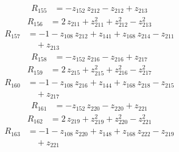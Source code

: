 \begin{equation*}\begin{aligned}
R_{155}&=-z_{152}\,z_{212} -z_{212} +z_{213}
\end{aligned}\end{equation*}
\begin{equation*}\begin{aligned}
R_{156}&=2\,z_{211} +z_{211}^{2} +z_{212}^{2} -z_{213}^{2}
\end{aligned}\end{equation*}
\begin{equation*}\begin{aligned}
R_{157}&=-1 -z_{108}\,z_{212} +z_{141} +z_{168}\,z_{214} -z_{211} \\
&\quad +z_{213}
\end{aligned}\end{equation*}
\begin{equation*}\begin{aligned}
R_{158}&=-z_{152}\,z_{216} -z_{216} +z_{217}
\end{aligned}\end{equation*}
\begin{equation*}\begin{aligned}
R_{159}&=2\,z_{215} +z_{215}^{2} +z_{216}^{2} -z_{217}^{2}
\end{aligned}\end{equation*}
\begin{equation*}\begin{aligned}
R_{160}&=-1 -z_{108}\,z_{216} +z_{144} +z_{168}\,z_{218} -z_{215} \\
&\quad +z_{217}
\end{aligned}\end{equation*}
\begin{equation*}\begin{aligned}
R_{161}&=-z_{152}\,z_{220} -z_{220} +z_{221}
\end{aligned}\end{equation*}
\begin{equation*}\begin{aligned}
R_{162}&=2\,z_{219} +z_{219}^{2} +z_{220}^{2} -z_{221}^{2}
\end{aligned}\end{equation*}
\begin{equation*}\begin{aligned}
R_{163}&=-1 -z_{108}\,z_{220} +z_{148} +z_{168}\,z_{222} -z_{219} \\
&\quad +z_{221}
\end{aligned}\end{equation*}

